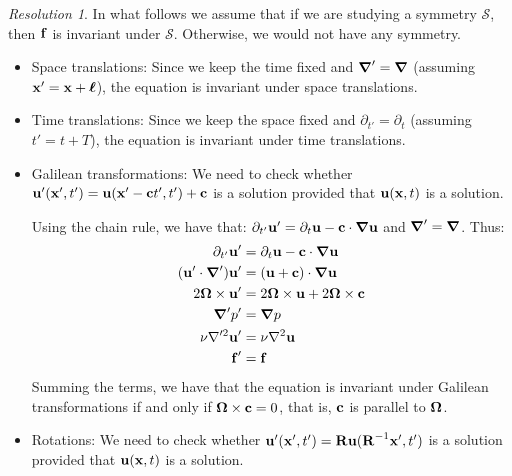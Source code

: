 \documentclass[10pt,a4paper]{article}
\theoremstyle{definition}
\theoremstyle{remark}
\newtheorem*{res}{Resolution}
\begin{document}
\begin{res}
  In what follows we assume that if we are studying a symmetry $\mathcal{S}$, then $\boldsymbol{\mathrm{f}}$ is invariant under $\mathcal{S}$. Otherwise, we would not have any symmetry.
  \begin{itemize}
    \item Space translations: Since we keep the time fixed and $\grad'=\grad$ (assuming $\boldsymbol{\mathrm{x}}'=\boldsymbol{\mathrm{x}}+\boldsymbol{\mathrm{\ell}}$), the equation is invariant under space translations.
    \item Time translations: Since we keep the space fixed and $\partial_{t'}=\partial_t$ (assuming $t'=t+T$), the equation is invariant under time translations.
    \item Galilean transformations: We need to check whether $\boldsymbol{\mathrm{u}}'(\boldsymbol{\mathrm{x}}',t') = \boldsymbol{\mathrm{u}}(\boldsymbol{\mathrm{x}}'-\boldsymbol{\mathrm{c}}t',t') + \boldsymbol{\mathrm{c}}$ is a solution provided that $\boldsymbol{\mathrm{u}}(\boldsymbol{\mathrm{x}},t)$ is a solution.

          Using the chain rule, we have that: $\partial_{t'}\boldsymbol{\mathrm{u}}'=\partial_{t}\boldsymbol{\mathrm{u}}-\boldsymbol{\mathrm{c}}\cdot\grad\boldsymbol{\mathrm{u}}$ and $\grad'=\grad$. Thus:
          \begin{align*}
            \partial_{t'}\boldsymbol{\mathrm{u}}'        & = \partial_t\boldsymbol{\mathrm{u}} - \boldsymbol{\mathrm{c}}\cdot\grad\boldsymbol{\mathrm{u}}     \\
            (\boldsymbol{\mathrm{u}}'\cdot\grad')\boldsymbol{\mathrm{u}}' & = (\boldsymbol{\mathrm{u}}+\boldsymbol{\mathrm{c}})\cdot\grad\boldsymbol{\mathrm{u}}               \\
            2\boldsymbol{\mathrm{\Omega}}\times\boldsymbol{\mathrm{u}}'     & = 2\boldsymbol{\mathrm{\Omega}}\times\boldsymbol{\mathrm{u}}+2\boldsymbol{\mathrm{\Omega}}\times\boldsymbol{\mathrm{c}} \\
            \grad' p'                   & = \grad p                                       \\
            \nu\nabla'^2\boldsymbol{\mathrm{u}}'         & = \nu\nabla^2\boldsymbol{\mathrm{u}}                             \\
            \boldsymbol{\mathrm{f}}'                     & = \boldsymbol{\mathrm{f}}
          \end{align*}
          Summing the terms, we have that the equation is invariant under Galilean transformations if and only if $\boldsymbol{\mathrm{\Omega}}\times \boldsymbol{\mathrm{c}} = 0$, that is, $\boldsymbol{\mathrm{c}}$ is parallel to $\boldsymbol{\mathrm{\Omega}}$.
    \item Rotations: We need to check whether $\boldsymbol{\mathrm{u}}'(\boldsymbol{\mathrm{x}}',t') = \boldsymbol{\mathrm{R}}\boldsymbol{\mathrm{u}}(\boldsymbol{\mathrm{R}}^{-1}\boldsymbol{\mathrm{x}}',t')$ is a solution provided that $\boldsymbol{\mathrm{u}}(\boldsymbol{\mathrm{x}},t)$ is a solution.


\end{itemize}
\end{res}
\end{document}
